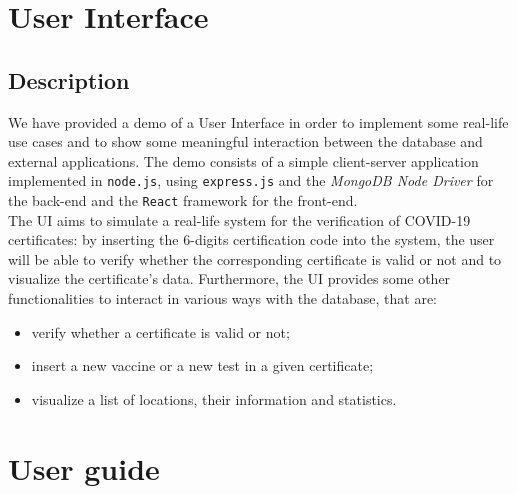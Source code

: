 \documentclass{article}
\begin{document}
\section{User Interface}
    \subsection{Description}
    We have provided a demo of a User Interface in order to implement some real-life use cases and to show some meaningful interaction between the database and external applications. The demo consists of a simple client-server application implemented in \verb|node.js|, using \verb|express.js| and the \textit{MongoDB Node Driver} for the back-end and the \verb|React| framework for the front-end.\\
    The UI aims to simulate a real-life system for the verification of COVID-19 certificates: by inserting the 6-digits certification code into the system, the user will be able to verify whether the corresponding certificate is valid or not and to visualize the certificate's data. Furthermore, the UI provides some other functionalities to interact in various ways with the database, that are:
    \begin{itemize}
    \item verify whether a certificate is valid or not;
    \item insert a new vaccine or a new test in a given certificate;
    \item visualize a list of locations, their information and statistics.
    \end{itemize}
\section{User guide}
\end{document}
